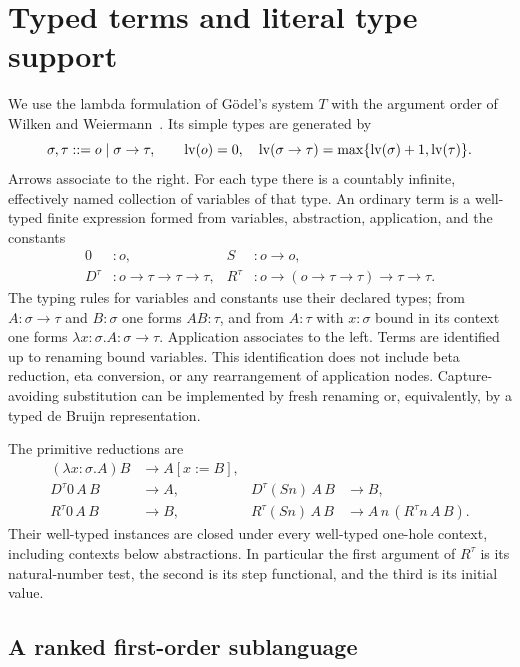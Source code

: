 \section{Typed terms and literal type support}\label{sec:syntax}

We use the lambda formulation of G\"odel's system $T$ with the argument
order of Wilken and Weiermann~\cite[Section~1]{ww}.  Its simple types are
generated by
\[
  \sigma,\tau ::= o\mid \sigma\to\tau,
  \qquad
  \operatorname{lv}(o)=0,\quad
  \operatorname{lv}(\sigma\to\tau)=\max\{\operatorname{lv}(\sigma)+1,\operatorname{lv}(\tau)\}.
\]
Arrows associate to the right.  For each type there is a countably infinite,
effectively named collection of variables of that type.  An ordinary term
is a well-typed finite expression formed from variables, abstraction,
application, and the constants
\[
\begin{aligned}
 0&:o,& S&:o\to o,\\
 D^\tau&:o\to\tau\to\tau\to\tau,&
 R^\tau&:o\to(o\to\tau\to\tau)\to\tau\to\tau.
\end{aligned}
\]
The typing rules for variables and constants use their declared types;
from $A:\sigma\to\tau$ and $B:\sigma$ one forms $AB:\tau$, and from
$A:\tau$ with $x:\sigma$ bound in its context one forms
$\lambda x:\sigma.A:\sigma\to\tau$.  Application associates to the left.
Terms are identified up to renaming bound variables.  This identification
does not include beta reduction, eta conversion, or any rearrangement of
application nodes.  Capture-avoiding substitution can be implemented by
fresh renaming or, equivalently, by a typed de Bruijn representation.

The primitive reductions are
\begin{align*}
 (\lambda x:\sigma.A)B&\longrightarrow A[x:=B],\\
 D^\tau 0\,A\,B&\longrightarrow A,
 &D^\tau(Sn)\,A\,B&\longrightarrow B,\\
 R^\tau 0\,A\,B&\longrightarrow B,
 &R^\tau(Sn)\,A\,B&\longrightarrow
      A\,n\,(R^\tau n\,A\,B).
\end{align*}
Their well-typed instances are closed under every well-typed one-hole
context, including contexts below abstractions.  In particular the first
argument of $R^\tau$ is its natural-number test, the second is its step
functional, and the third is its initial value.

\subsection{A ranked first-order sublanguage}

